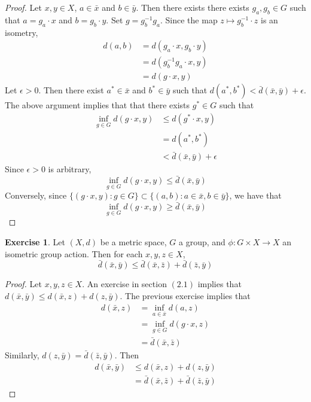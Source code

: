 \documentclass[12pt]{amsart}
\theoremstyle{definition}
\newtheorem{ex}[definition]{Exercise}
\newcommand{\ep}{\epsilon}
\newcommand{\lex}[1]{\label{ex:#1}}
\begin{document}
	\begin{proof}
	Let $x, y \in X$, $a \in \bar{x}$ and $b \in \bar{y}$. Then there exists there exists $g_a, g_b \in G$ such that $a = g_a \cdot x$ and $b = g_b \cdot y$. Set $g = g_b^{-1}g_a$. Since the map $z \mapsto g_b^{-1} \cdot z$ is an isometry, 
	\begin{align*}
	d(a,b) 
	&= d(g_a \cdot x, g_b \cdot y) \\
	&= d(g_b^{-1}g_a \cdot x, y)\\
	&= d(g\cdot x, y)
	\end{align*}
	Let $\ep >0$. Then there exist $a^* \in \bar{x}$ and $b^* \in \bar{y}$ such that $d(a^*,b^*) < \bar{d}(\bar{x},\bar{y}) + \ep$. The above argument implies that that there exists $g^* \in G$ such that 
	\begin{align*} 
	\inf_{g \in G} d(g \cdot x, y) 
	& \leq d(g^* \cdot x, y) \\
	&= d(a^*, b^*) \\
	& < \bar{d}(\bar{x}, \bar{y}) + \ep
\end{align*}	 
	Since $\ep >0$ is arbitrary, $$\inf_{g \in G} d(g \cdot x, y) \leq \bar{d}(\bar{x}, \bar{y})$$
	Conversely, since $\{(g \cdot x, y): g \in G\} \subset \{(a,b): a \in \bar{x}, b \in \bar{y}\}$, we have that 
	$$\inf_{g \in G} d(g \cdot x, y) \geq \bar{d}(\bar{x}, \bar{y})$$ 
	\end{proof}
	
	\begin{ex} \lex{}
	Let $(X, d)$ be a metric space, $G$ a group, and $\phi: G \times X \rightarrow X$ an isometric group action. Then for each $x, y, z \in X$, $$\bar{d}(\bar{x}, \bar{y}) \leq \bar{d}(\bar{x}, \bar{z}) + \bar{d}(\bar{z}, \bar{y})$$
	\end{ex}
	
	\begin{proof}
	Let $x, y, z \in X$. An exercise in section $(2.1)$ implies that $d(\bar{x}, \bar{y}) \leq d(\bar{x}, z) + d(z, \bar{y})$. The previous exercise implies that 
	\begin{align*}
	d(\bar{x}, z) 
	&= \inf_{a \in \bar{x}} d(a, z) \\
	&= \inf_{g \in G} d(g \cdot x, z) \\
	&= \bar{d}(\bar{x}, \bar{z})
	\end{align*}
	Similarly, $d(z, \bar{y}) = \bar{d}(\bar{z}, \bar{y})$. Then 
	\begin{align*}
	d(\bar{x}, \bar{y}) 
	&\leq d(\bar{x}, z) + d(z, \bar{y}) \\
	&= \bar{d}(\bar{x}, \bar{z}) + \bar{d}(\bar{z}, \bar{y})
	\end{align*}
	\end{proof}
	
\end{document}
